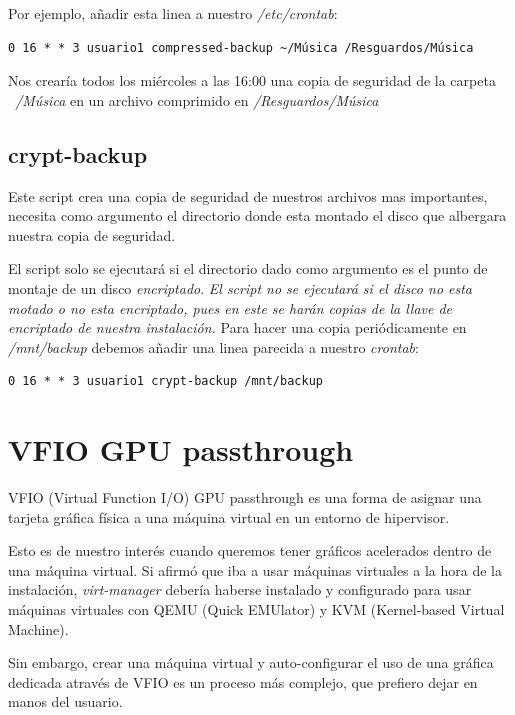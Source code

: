 \documentclass[12pt]{article}
\begin{document}
Por ejemplo, añadir esta linea a nuestro \emph{/etc/crontab}:

\begin{verbatim}
0 16 * * 3 usuario1 compressed-backup ~/Música /Resguardos/Música
\end{verbatim}

Nos crearía todos los miércoles a las 16:00 una copia de seguridad de la carpeta \emph{~/Música} en un archivo comprimido en \emph{/Resguardos/Música}

\subsection{crypt-backup}

Este script crea una copia de seguridad de nuestros archivos mas importantes, necesita como argumento el directorio donde esta montado el disco que albergara nuestra copia de seguridad.

El script solo se ejecutará si el directorio dado como argumento es el punto de montaje de un disco \emph{encriptado}. \emph{El script no se ejecutará si el disco no esta motado o no esta encriptado, pues en este se harán copias de la llave de encriptado de nuestra instalación.} Para hacer una copia periódicamente en \emph{/mnt/backup} debemos añadir una linea parecida a nuestro \emph{crontab}:

\begin{verbatim}
0 16 * * 3 usuario1 crypt-backup /mnt/backup
\end{verbatim}

\section{VFIO GPU passthrough}

VFIO (Virtual Function I/O) GPU passthrough es una forma de asignar una tarjeta gráfica física a una máquina virtual en un entorno de hipervisor.

Esto es de nuestro interés cuando queremos tener gráficos acelerados dentro de una máquina virtual. Si afirmó que iba a usar máquinas virtuales a la hora de la instalación, \emph{virt-manager} debería haberse instalado y configurado para usar máquinas virtuales con QEMU (Quick EMUlator) y KVM (Kernel-based Virtual Machine).

Sin embargo, crear una máquina virtual y auto-configurar el uso de una gráfica dedicada através de VFIO es un proceso más complejo, que prefiero dejar en manos del usuario.
\end{document}
